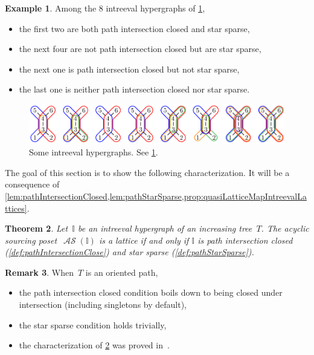 \documentclass{amsart}
\newtheorem{theorem}{Theorem}[section]
\theoremstyle{definition}
\newtheorem{example}[theorem]{Example}
\newtheorem{remark}[theorem]{Remark}
\DeclareMathOperator{\ASour}{\mathcal{AS}}  %
\newcommand{\II}{\mathbb I} %
\begin{document}
\begin{example}
\label{exm:intreevalHypergraphs}
Among the $8$ intreeval hypergraphs of \cref{fig:intreevalHypergraphs},
\begin{itemize}
\item the first two are both path intersection closed and star sparse,
\item the next four are not path intersection closed but are star sparse,
\item the next one is path intersection closed but not star sparse,
\item the last one is neither path intersection closed nor star sparse.
\end{itemize}

\begin{figure}[b]
	\centerline{\includegraphics[scale=.8]{intreevalHypergraphs}}
	\caption{Some intreeval hypergraphs. See \cref{exm:intreevalHypergraphs}.}
	\label{fig:intreevalHypergraphs}
\end{figure}
\end{example}

The goal of this section is to show the following characterization.
It will be a consequence of \cref{lem:pathIntersectionClosed,lem:pathStarSparse,prop:quasiLatticeMapIntreevalLattices}.

\begin{theorem}
\label{thm:intreevalLattices}
Let~$\II$ be an intreeval hypergraph of an increasing tree~$T$.
The acyclic sourcing poset~$\ASour(\II)$ is a lattice if and only if $\II$ is path intersection closed (\cref{def:pathIntersectionClose}) and star sparse (\cref{def:pathStarSparse}).
\end{theorem}

\begin{remark}
When~$T$ is an oriented path, 
\begin{itemize}
\item the path intersection closed condition boils down to being closed under intersection (including singletons by default),
\item the star sparse condition holds trivially,
\item the characterization of \cref{thm:intreevalLattices} was proved in~\cite[Thm.~A]{BergeronPilaud}.
\end{itemize}
\end{remark}
\end{document}
